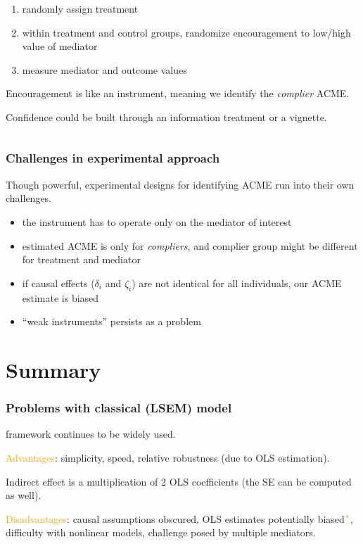 \documentclass[11pt,english,dvipsnames,aspectratio=169,handout]{beamer}\usepackage[]{graphicx}\usepackage[]{xcolor}
\begin{document}
\begin{frame}
\begin{columns}
\begin{column}{0.55\textwidth}
			\begin{enumerate}
				\item randomly assign treatment
				\item within treatment and control groups, randomize encouragement to low/high value of mediator
				\item measure mediator and outcome values
			\end{enumerate}\bigskip
		\pause
		
		Encouragement is like an instrument, meaning we identify the \textit{complier} ACME.\bigskip
		\pause
		
		Confidence could be built through an information treatment or a vignette.
			
		\end{column}
	\end{columns}
	
\end{frame}

\begin{frame}
	\frametitle{Challenges in experimental approach}
	Though powerful, experimental designs for identifying ACME run into their own challenges.\bigskip
	\pause
	
	\begin{itemize}
		\item the instrument has to operate only on the mediator of interest\pause
		\item estimated ACME is only for \textit{compliers}, and complier group might be different for treatment and mediator\pause
		\item if causal effects ($\delta_i$ and $\zeta_i$) are not identical for all individuals, our ACME estimate is biased\pause
		\item ``weak instruments'' persists as a problem
	\end{itemize}
	
\end{frame}



\section{Summary}

\begin{frame}
	\frametitle{Problems with classical (LSEM) model}
	 framework continues to be widely used.\bigskip
	\pause
	
	\textcolor{orange}{Advantages}: simplicity, speed, relative robustness (due to OLS estimation).\bigskip
	\pause
	
	Indirect effect is a multiplication of 2 OLS coefficients (the SE can be computed as well).\bigskip
	\pause
	
	\textcolor{orange}{Disadvantages}: causal assumptions obscured, OLS estimates potentially biased$^{\textcolor{orange}{*}}$, difficulty with nonlinear models, challenge posed by multiple mediators.
	
\end{frame}
\end{document}
